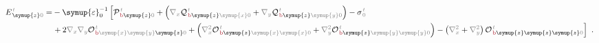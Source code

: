 \begin{subequations}
\begin{align}
	E^{\;\!\mathcolor{gray}{t}}_{\;\! \symup{z}\mathcolor{gray}{0}} = &- {\symup{\varepsilon}}_0^{-1} \left[ {\mathcal{P}}^{\;\!\mathcolor{gray}{t}}_{\;\!\textcolor{Maroon}{\text{b}} \symup{z} \mathcolor{gray}{0}} + \left( \mathcolor{gray}{\nabla_x} {\mathcal{Q}}^{\;\!\mathcolor{gray}{t}}_{\;\!\textcolor{Maroon}{\text{b}} \symup{z} \mathcolor{gray}{\symup{x}} \mathcolor{gray}{0}} + \mathcolor{gray}{\nabla_y} {\mathcal{Q}}^{\;\!\mathcolor{gray}{t}}_{\;\!\textcolor{Maroon}{\text{b}} \symup{z} \mathcolor{gray}{\symup{y}} \mathcolor{gray}{0}} \right) - {\sigma}^{\;\!\mathcolor{gray}{t}}_{\;\! \mathcolor{gray}{0}} \right. \label{eq:E_z0'} \\ & \left. +\hspace{0.2em} 2 \mathcolor{gray}{\nabla_x} \mathcolor{gray}{\nabla_y} {\mathcal{O}}^{\;\!\mathcolor{gray}{t}}_{\;\!\textcolor{Maroon}{\text{b}} \mathcolor{gray}{\symup{x}} \mathcolor{gray}{\symup{y}} \symup{z} \mathcolor{gray}{0}} + \left( \mathcolor{gray}{\nabla_x^2} {\mathcal{O}}^{\;\!\mathcolor{gray}{t}}_{\;\!\textcolor{Maroon}{\text{b}} \symup{z} \mathcolor{gray}{\symup{x}} \mathcolor{gray}{\symup{x}} \mathcolor{gray}{0}} + \mathcolor{gray}{\nabla_y^2} {\mathcal{O}}^{\;\!\mathcolor{gray}{t}}_{\;\!\textcolor{Maroon}{\text{b}} \symup{z} \mathcolor{gray}{\symup{y}} \mathcolor{gray}{\symup{y}} \mathcolor{gray}{0}} \right) - \left( \mathcolor{gray}{\nabla_x^2} + \mathcolor{gray}{\nabla_y^2} \right) {\mathcal{O}}^{\;\!\mathcolor{gray}{t}}_{\;\!\textcolor{Maroon}{\text{b}} \symup{z} \symup{z} \symup{z} \mathcolor{gray}{0}} \right] ~.
\end{align}
\end{subequations}

